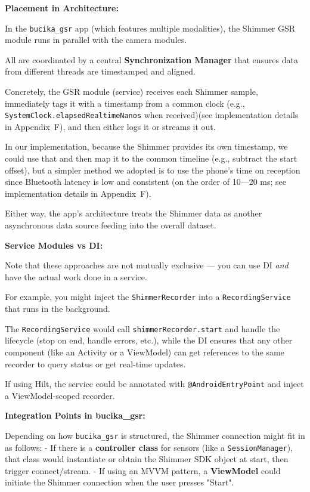 {{\textbf{Placement in Architecture:}

In the \texttt{bucika_gsr} app (which features multiple modalities), the Shimmer GSR
module runs in parallel with the camera modules.

All are coordinated by a central \textbf{Synchronization Manager}
 that ensures data from different threads are timestamped and aligned.

Concretely, the GSR module (service) receives each Shimmer sample, immediately tags
it with a timestamp from a common clock (e.g.,
\texttt{SystemClock.elapsedRealtimeNanos} when received)(see implementation details
in Appendix~F), and then either logs it or streams it out.

In our implementation, because the Shimmer provides its own timestamp, we could use
that and then map it to the common timeline (e.g., subtract the start offset), but a
simpler method we adopted is to use the phone's time on reception since Bluetooth
latency is low and consistent (on the order of 10---20 ms; see implementation details
in Appendix~F).

Either way, the app's architecture treats the Shimmer data as another asynchronous
data source feeding into the overall dataset.

\textbf{Service Modules vs DI:}

Note that these approaches are not mutually exclusive --- you can use DI \textit{and}
have the actual work done in a service.

For example, you might inject the \texttt{ShimmerRecorder} into a
\texttt{RecordingService} that runs in the background.

The \texttt{RecordingService} would call \texttt{shimmerRecorder.start} and handle
the lifecycle (stop on end, handle errors, etc.), while the DI ensures that any other
component (like an Activity or a ViewModel) can get references to the same recorder
to query status or get real-time updates.

If using Hilt, the service could be annotated with \texttt{@AndroidEntryPoint} and
inject a ViewModel-scoped recorder.

\textbf{Integration Points in bucika_gsr:}

Depending on how \texttt{bucika_gsr} is structured, the Shimmer connection might fit
in as follows: - If there is a \textbf{controller class}
 for sensors (like a \texttt{SessionManager}), that class would instantiate or obtain
 the Shimmer SDK object at start, then trigger connect/stream.  - If using an MVVM
 pattern, a \textbf{ViewModel}
 could initiate the Shimmer connection when the user presses "Start".

}}
